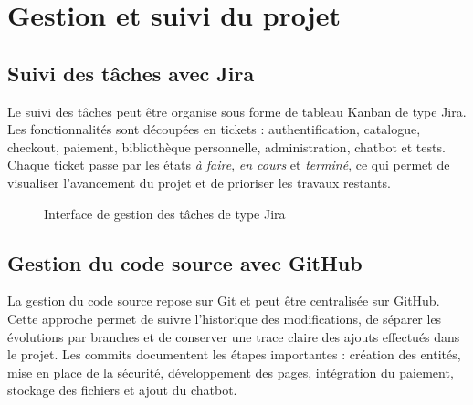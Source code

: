 \documentclass[12pt,a4paper]{report}
\begin{document}
\section{Gestion et suivi du projet}

\subsection{Suivi des tâches avec Jira}

Le suivi des tâches peut être organise sous forme de tableau Kanban de type Jira. Les fonctionnalités sont découpées en tickets : authentification, catalogue, checkout, paiement, bibliothèque personnelle, administration, chatbot et tests. Chaque ticket passe par les états \textit{à faire}, \textit{en cours} et \textit{terminé}, ce qui permet de visualiser l'avancement du projet et de prioriser les travaux restants.

\begin{figure}[htbp]
    \centering
    \caption{Interface de gestion des tâches de type Jira}
\end{figure}

\subsection{Gestion du code source avec GitHub}

La gestion du code source repose sur Git et peut être centralisée sur GitHub. Cette approche permet de suivre l'historique des modifications, de séparer les évolutions par branches et de conserver une trace claire des ajouts effectués dans le projet. Les commits documentent les étapes importantes : création des entités, mise en place de la sécurité, développement des pages, intégration du paiement, stockage des fichiers et ajout du chatbot.
\end{document}
